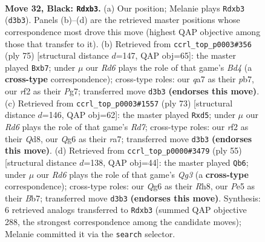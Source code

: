 \documentclass[11pt]{article}
\begin{document}
\clearpage

\begin{figure}[p]\centering
\begin{subfigure}{0.46\textwidth}\centering
\resizebox{\linewidth}{!}{%
\newchessgame
\chessboard[
  setfen={nr4k1/Q4pb1/p5qp/4p3/4P2n/1P1r1P2/1P1B1RN1/RN4K1 b - - 1 32},
  showmover=false,
  pgfstyle=straightmove, color=movearrow, markmove={d3-b3}
]}
\caption{}
\end{subfigure}\hfill
\begin{subfigure}{0.46\textwidth}\centering
\resizebox{\linewidth}{!}{%
\newchessgame
\chessboard[
  setfen={2r3k1/1P3pp1/5q1p/3b4/1nN2P1P/1Q6/rB5K/2R1RB2 b - - 0 38},
  showmover=false,
  pgfstyle=straightmove, color=movearrow, markmove={d5-b7}
]}
\caption{}
\end{subfigure}
\\[4pt]
\begin{subfigure}{0.46\textwidth}\centering
\resizebox{\linewidth}{!}{%
\newchessgame
\chessboard[
  setfen={3q4/R1pb2kp/3p2r1/2PPpp1Q/8/7P/3r1PP1/R2N3K b - - 0 37},
  showmover=false,
  pgfstyle=straightmove, color=movearrow, markmove={d2-d5}
]}
\caption{}
\end{subfigure}\hfill
\begin{subfigure}{0.46\textwidth}\centering
\resizebox{\linewidth}{!}{%
\newchessgame
\chessboard[
  setfen={5k1r/1b2bpN1/p5qP/8/1nQp1B2/3P3R/1P2N3/4K3 b - - 2 28},
  showmover=false,
  pgfstyle=straightmove, color=movearrow, markmove={g6-b6}
]}
\caption{}
\end{subfigure}
\caption{\textbf{Move 32, Black: \texttt{Rdxb3}.} (a) Our position; Melanie plays \texttt{Rdxb3} (\texttt{d3b3}). Panels (b)--(d) are the retrieved master positions whose correspondence most drove this move (highest QAP objective among those that transfer to it). (b) Retrieved from \texttt{ccrl\_top\_p0003\#356} (ply 75) [structural distance $d$=147, QAP obj=65]: the master played \texttt{Bxb7}; under $\mu$ our \emph{Rd6} plays the role of that game's \emph{Bd4} (a \textbf{cross-type} correspondence); cross-type roles: our \emph{q}a7 as their \emph{p}b7, our \emph{r}f2 as their \emph{P}g7; transferred move \texttt{d3b3} \textbf{(endorses this move)}. (c) Retrieved from \texttt{ccrl\_top\_p0003\#1557} (ply 73) [structural distance $d$=146, QAP obj=62]: the master played \texttt{Rxd5}; under $\mu$ our \emph{Rd6} plays the role of that game's \emph{Rd7}; cross-type roles: our \emph{r}f2 as their \emph{Q}d8, our \emph{Q}g6 as their \emph{r}a7; transferred move \texttt{d3b3} \textbf{(endorses this move)}. (d) Retrieved from \texttt{ccrl\_top\_p0000\#3479} (ply 55) [structural distance $d$=138, QAP obj=44]: the master played \texttt{Qb6}; under $\mu$ our \emph{Rd6} plays the role of that game's \emph{Qg3} (a \textbf{cross-type} correspondence); cross-type roles: our \emph{Q}g6 as their \emph{R}h8, our \emph{P}e5 as their \emph{B}b7; transferred move \texttt{d3b3} \textbf{(endorses this move)}. Synthesis: 6 retrieved analogs transferred to \texttt{Rdxb3} (summed QAP objective 288, the strongest correspondence among the candidate moves); Melanie committed it via the \texttt{search} selector.}
\label{fig:thought-m63}
\end{figure}
\end{document}
